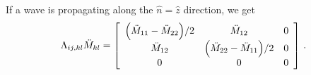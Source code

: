 \documentclass[main.tex]{subfiles}
\begin{document}
If a wave is propagating along the \(\hat{n} = \hat{z}\) direction, we get 
%
\begin{subequations}
\begin{align}
\Lambda_{ij, kl} \ddot{M}_{kl} = \left[\begin{array}{ccc}
\qty(\ddot{M}_{11} - \ddot{M}_{22}) / 2 &  \ddot{M}_{12} & 0 \\ 
\ddot{M}_{12} & \qty(\ddot{M}_{22} - \ddot{M}_{11}) / 2 & 0 \\ 
0 & 0 & 0
\end{array}\right]
\,.
\end{align}
\end{subequations}
\end{document}
